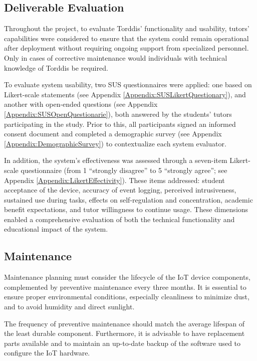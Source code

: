                 \subsection{Deliverable Evaluation}
                Throughout the project, to evaluate Torddis' functionality and usability, tutors’ capabilities were considered to ensure that the system could remain operational after deployment without requiring ongoing support from specialized personnel. Only in cases of corrective maintenance would individuals with technical knowledge of Torddis be required.
                
                To evaluate system usability, two SUS questionnaires \citep{Brooke1996SUS} were applied: one based on Likert-scale statements (see Appendix \ref{Appendix:SUSLikertQuestionary}), and another with open-ended questions (see Appendix \ref{Appendix:SUSOpenQuestionarie}), both answered by the students’ tutors participating in the study. Prior to this, all participants signed an informed consent document and completed a demographic survey (see Appendix \ref{Appendix:DemographicSurvey}) to contextualize each system evaluator.
                
                In addition, the system’s effectiveness was assessed through a seven-item Likert-scale questionnaire (from 1 “strongly disagree” to 5 “strongly agree”; see Appendix \ref{Appendix:LikertEffectivity}). These items addressed: student acceptance of the device, accuracy of event logging, perceived intrusiveness, sustained use during tasks, effects on self-regulation and concentration, academic benefit expectations, and tutor willingness to continue usage. These dimensions enabled a comprehensive evaluation of both the technical functionality and educational impact of the system.
                
                \subsection{Maintenance}
                Maintenance planning must consider the lifecycle of the IoT device components, complemented by preventive maintenance every three months. It is essential to ensure proper environmental conditions, especially cleanliness to minimize dust, and to avoid humidity and direct sunlight.
                
                The frequency of preventive maintenance should match the average lifespan of the least durable component. Furthermore, it is advisable to have replacement parts available and to maintain an up-to-date backup of the software used to configure the IoT hardware.
                
